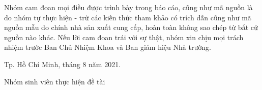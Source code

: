 Nhóm cam đoan mọi điều được trình bày trong báo cáo, cũng như mã nguồn là do nhóm tự thực hiện - trừ các kiến thức tham khảo có trích dẫn cũng như mã nguồn mẫu do chính nhà sản xuất cung cấp, hoàn toàn không sao chép từ bất cứ nguồn nào khác. Nếu lời cam đoan trái với sự thật, nhóm xin chịu mọi trách nhiệm trước Ban Chủ Nhiệm Khoa và Ban giám hiệu Nhà trường.
\begin{flushright}
Tp. Hồ Chí Minh, tháng 8 năm 2021.\par

Nhóm sinh viên thực hiện đề tài
\end{flushright}